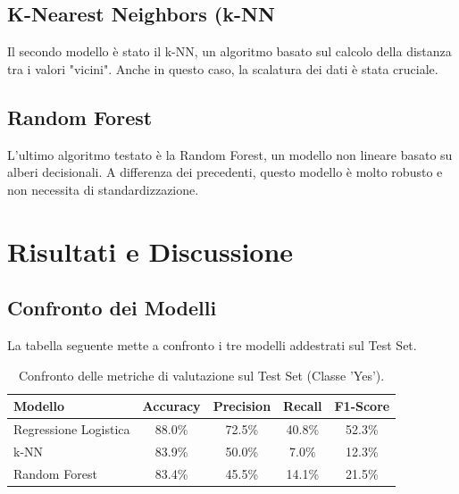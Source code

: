\documentclass[11pt, a4paper]{article}
\begin{document}
\subsection{K-Nearest Neighbors (k-NN}
Il secondo modello è stato il k-NN, un algoritmo basato sul calcolo della distanza tra i valori "vicini". Anche in questo caso, la scalatura dei dati è stata cruciale.

\subsection{Random Forest}
L'ultimo algoritmo testato è la Random Forest, un modello non lineare basato su alberi decisionali. A differenza dei precedenti, questo modello è molto robusto e non necessita di standardizzazione.

\section{Risultati e Discussione}

\subsection{Confronto dei Modelli}
La tabella seguente mette a confronto i tre modelli addestrati sul Test Set. 

\begin{table}[ht]
    \centering
    \begin{tabular}{|l|c|c|c|c|}
        \hline
        \textbf{Modello} & \textbf{Accuracy} & \textbf{Precision} & \textbf{Recall} & \textbf{F1-Score} \\
        \hline
        Regressione Logistica & 88.0\% & 72.5\% & 40.8\% & 52.3\% \\
        k-NN & 83.9\% & 50.0\% & 7.0\% & 12.3\% \\
        Random Forest & 83.4\% & 45.5\% & 14.1\% & 21.5\% \\
        \hline
    \end{tabular}
    \caption{Confronto delle metriche di valutazione sul Test Set (Classe 'Yes').}
    \label{tab:metriche}
\end{table}
\end{document}
